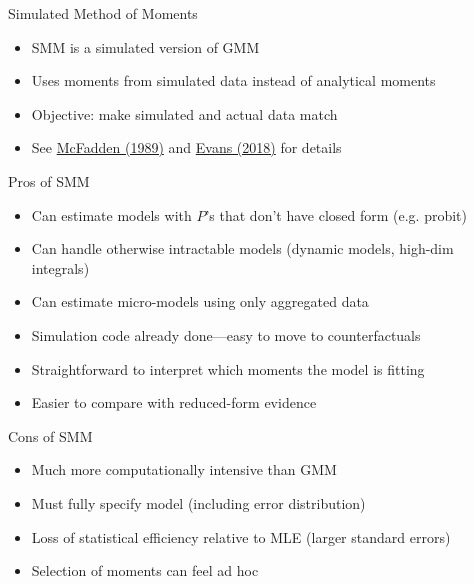 \documentclass[aspectratio=169]{beamer}
\begin{document}
\begin{frame}

Simulated Method of Moments

\bigskip

\begin{itemize}
\itemsep1.5em
\item<2-> SMM is a simulated version of GMM
\item<3-> Uses moments from simulated data instead of analytical moments
\item<4-> Objective: make simulated and actual data match
\item<5-> See \href{http://www.jstor.org/stable/1913621}{McFadden (1989)} and \href{https://github.com/QuantEcon/notebook-gallery/blob/main/ipynb/richard_w_evans-smmest.ipynb}{Evans (2018)} for details
\end{itemize}

\end{frame}

\begin{frame}

Pros of SMM

\bigskip

\begin{itemize}
\itemsep1.5em
\item<2-> Can estimate models with $P$'s that don't have closed form (e.g. probit)
\item<3-> Can handle otherwise intractable models (dynamic models, high-dim integrals)
\item<4-> Can estimate micro-models using only aggregated data
\item<5-> Simulation code already done---easy to move to counterfactuals
\item<6-> Straightforward to interpret which moments the model is fitting
\item<7-> Easier to compare with reduced-form evidence
\end{itemize}

\end{frame}

\begin{frame}

Cons of SMM

\bigskip

\begin{itemize}
\itemsep1.5em
\item<2-> Much more computationally intensive than GMM
\item<3-> Must fully specify model (including error distribution)
\item<4-> Loss of statistical efficiency relative to MLE (larger standard errors)
\item<5-> Selection of moments can feel ad hoc
\end{itemize}

\end{frame}
\end{document}

